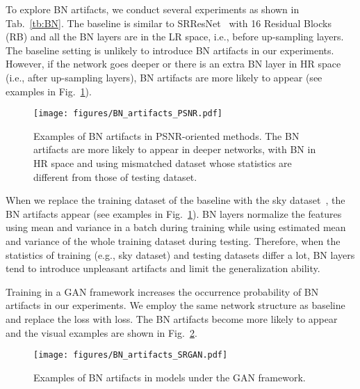 \documentclass[runningheads]{llncs}
\begin{document}
To explore BN artifacts, we conduct several experiments as shown in Tab.~\ref{tb:BN}.
The baseline is similar to SRResNet~\cite{ledig2017photo} with 16 Residual Blocks (RB) and all the BN layers are in 
the LR space, i.e., before up-sampling layers. 
The baseline setting is unlikely to introduce BN artifacts in our experiments.
However, if the network goes deeper or there is an extra BN layer in HR space (i.e., after up-sampling layers), BN 
artifacts are more likely to appear (see examples in Fig.~\ref{fig:BN_artifacts_PSNR}). 

\begin{figure}[htbp]
	\vspace{-0.2cm}
	\begin{center}
\texttt{[image: figures/BN\_artifacts\_PSNR.pdf]}
	\end{center}
	\vspace{-0.4cm}
	\caption{Examples of BN artifacts in PSNR-oriented methods. The BN artifacts are more likely to appear in deeper 
		networks, with BN in HR space and using mismatched dataset whose statistics are different from those of 
		testing dataset.}
	\vspace{-0.4cm}
	\label{fig:BN_artifacts_PSNR}
\end{figure}


When we replace the training dataset of the baseline with the sky dataset~\cite{wang2018sftgan}, the BN artifacts 
appear (see examples in Fig.~\ref{fig:BN_artifacts_PSNR}).
BN layers normalize the features using mean and variance in a batch during training while using estimated 
mean and variance of the whole training dataset during testing.
Therefore, when the statistics of training (e.g., sky dataset) and testing datasets differ a lot, BN layers tend to 
introduce unpleasant artifacts and limit the generalization ability.

Training in a GAN framework increases the occurrence probability of BN artifacts in our experiments. 
We employ the same network structure as baseline and replace the  loss with  loss.
The BN artifacts become more likely to appear and the visual examples are shown in Fig.~\ref{fig:BN_artifacts_SRGAN}.


\begin{figure}[htbp]
	\vspace{-0.4cm}
	\begin{center}
\texttt{[image: figures/BN\_artifacts\_SRGAN.pdf]}
	\end{center}
	\vspace{-0.4cm}
	\caption{Examples of BN artifacts in models under the GAN framework.}
	\label{fig:BN_artifacts_SRGAN}
	\vspace{-0.4cm}
\end{figure}
\end{document}
